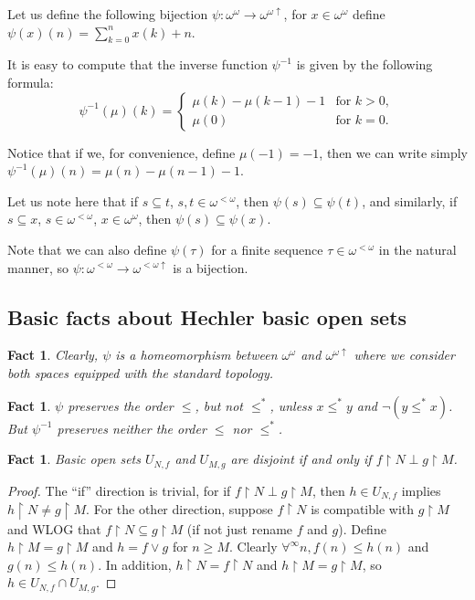 \documentclass[12pt]{amsart}
\theoremstyle{plain}
\newtheorem{fact}[theorem]{Fact}
\theoremstyle{definition}
\theoremstyle{remark}
\newcommand{\baire}{\omega^{\omega}}
\newcommand{\finbaire}{\omega^{<\omega}}
\newcommand{\finincrbaire}{\omega^{< \omega \uparrow}}
\newcommand{\incrbaire}{\omega^{\omega \uparrow}}
\newcommand{\inversepsi}{\psi^{-1}}
\newcommand{\Hechler}[2]{U_{#1,#2}}
\newcommand{\ffid}{\inversepsi}
\begin{document}
Let us define the following bijection 
$\psi \colon \baire \to \incrbaire$, for
$x \in \baire$ define
$\psi(x)(n) = \sum_{k = 0}^n x(k) + n$.

It is easy to compute that the inverse function $\ffid$ is given by the following
formula: 
\[
\ffid(\mu)(k) =
\begin{cases}
\mu(k) - \mu(k - 1) - 1 & \text{for } k > 0,\\
\mu(0) & \text{for } k = 0.
\end{cases}
\]
 
  Notice that if we, for convenience, define $\mu(-1) = -1$,
then we can write simply
$\inversepsi(\mu)(n) = \mu(n) - \mu(n - 1) - 1$.

  Let us note here that if $s \subseteq t$, $s,t\in\finbaire$,
then $\psi(s) \subseteq \psi(t)$, and similarly,
if $s \subseteq x$, $s\in\finbaire$, $x \in \baire$,
then $\psi(s) \subseteq \psi(x)$.

Note that we can also define $\psi(\tau)$
for a finite sequence $\tau\in\finbaire$ in the natural
manner, so $\psi\colon\finbaire\to\finincrbaire$ is a bijection.

\subsection{Basic facts about Hechler basic open sets}
\noindent
\begin{fact}
  Clearly, $\psi$ is a homeomorphism between
  $\baire$ and $\incrbaire$
  where we consider both spaces equipped with the standard topology.
\end{fact}

\begin{fact}
  $\psi$ preserves the order $\leq$, but not $\leq^*$, unless 
  $x \leq^* y$ and $\neg (y \leq^* x)$.
But $\inversepsi$ preserves neither the order $\leq$ nor $\leq^*$.
\end{fact}

\begin{fact}
  Basic open sets $\Hechler{N}{f}$
and $\Hechler{M}{g}$ are disjoint
if and only if $f\restriction N \perp g\restriction M$.
\end{fact}
\begin{proof}
The ``if'' direction is trivial, for if 
$f\restriction N\perp g\restriction M$, then
$h\in \Hechler{N}{f}$ implies
$h\restriction N \not= g\restriction M$.
For the other direction, suppose $f\restriction N$ is compatible
with $g\restriction M$ and
WLOG that $f\restriction N \subseteq g\restriction M$ (if not just rename $f$ and $g$).
Define $h\restriction M = g\restriction M$ and $h = f\vee g$ for $n\ge M$. 
Clearly $\forall^\infty n, f(n) \le h(n)$ and $g(n) \le h(n)$.
In addition,
$h\restriction N = f\restriction N$ and $h\restriction M = g\restriction M$,
so $h \in \Hechler{N}{f} \cap \Hechler{M}{g}$.
\end{proof}
\end{document}
